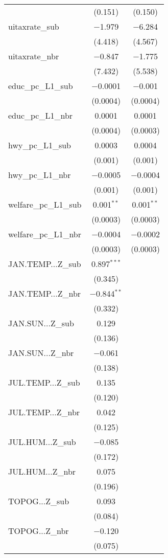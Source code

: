 \begin{table}[!htbp]
\begin{tabular}{@{\extracolsep{5pt}}lcc}
  & (0.151) & (0.150) \\ 
  uitaxrate\_sub & $-$1.979 & $-$6.284 \\ 
  & (4.418) & (4.567) \\ 
  uitaxrate\_nbr & $-$0.847 & $-$1.775 \\ 
  & (7.432) & (5.538) \\ 
  educ\_pc\_L1\_sub & $-$0.0001 & $-$0.001 \\ 
  & (0.0004) & (0.0004) \\ 
  educ\_pc\_L1\_nbr & 0.0001 & 0.0001 \\ 
  & (0.0004) & (0.0003) \\ 
  hwy\_pc\_L1\_sub & 0.0003 & 0.0004 \\ 
  & (0.001) & (0.001) \\ 
  hwy\_pc\_L1\_nbr & $-$0.0005 & $-$0.0004 \\ 
  & (0.001) & (0.001) \\ 
  welfare\_pc\_L1\_sub & 0.001$^{**}$ & 0.001$^{**}$ \\ 
  & (0.0003) & (0.0003) \\ 
  welfare\_pc\_L1\_nbr & $-$0.0004 & $-$0.0002 \\ 
  & (0.0003) & (0.0003) \\ 
  JAN.TEMP...Z\_sub & 0.897$^{***}$ &  \\ 
  & (0.345) &  \\ 
  JAN.TEMP...Z\_nbr & $-$0.844$^{**}$ &  \\ 
  & (0.332) &  \\ 
  JAN.SUN...Z\_sub & 0.129 &  \\ 
  & (0.136) &  \\ 
  JAN.SUN...Z\_nbr & $-$0.061 &  \\ 
  & (0.138) &  \\ 
  JUL.TEMP...Z\_sub & 0.135 &  \\ 
  & (0.120) &  \\ 
  JUL.TEMP...Z\_nbr & 0.042 &  \\ 
  & (0.125) &  \\ 
  JUL.HUM...Z\_sub & $-$0.085 &  \\ 
  & (0.172) &  \\ 
  JUL.HUM...Z\_nbr & 0.075 &  \\ 
  & (0.196) &  \\ 
  TOPOG...Z\_sub & 0.093 &  \\ 
  & (0.084) &  \\ 
  TOPOG...Z\_nbr & $-$0.120 &  \\ 
  & (0.075) &  \\ 

\end{tabular}
\end{table}

